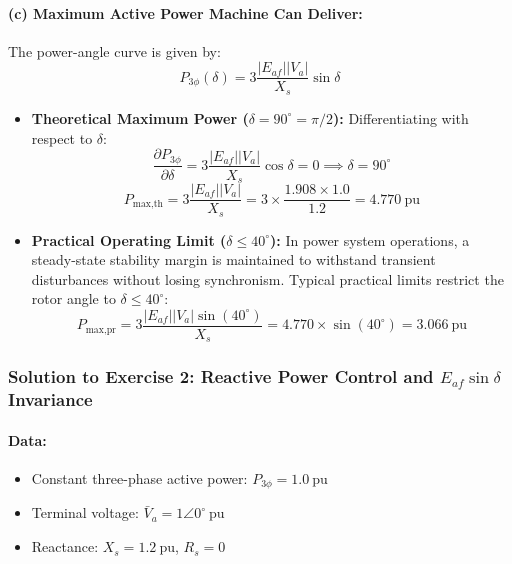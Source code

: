 \paragraph{(c) Maximum Active Power Machine Can Deliver:}
The power-angle curve is given by:
\begin{equation}
    P_{3\phi}(\delta) = 3 \frac{|E_{af}| |V_a|}{X_s} \sin\delta
\end{equation}
\begin{itemize}
    \item \textbf{Theoretical Maximum Power ($\delta = 90^\circ = \pi/2$):}
    Differentiating with respect to $\delta$:
    \[
    \frac{\partial P_{3\phi}}{\partial \delta} = 3 \frac{|E_{af}| |V_a|}{X_s} \cos\delta = 0 \implies \delta = 90^\circ
    \]
    \begin{equation}
        \boxed{P_{\text{max,th}} = 3 \frac{|E_{af}| |V_a|}{X_s} = 3 \times \frac{1.908 \times 1.0}{1.2} = 4.770\ \text{pu}}
    \end{equation}

    \item \textbf{Practical Operating Limit ($\delta \le 40^\circ$):}
    In power system operations, a steady-state stability margin is maintained to withstand transient disturbances without losing synchronism. Typical practical limits restrict the rotor angle to $\delta \le 40^\circ$:
    \begin{equation}
        \boxed{P_{\text{max,pr}} = 3 \frac{|E_{af}| |V_a| \sin(40^\circ)}{X_s} = 4.770 \times \sin(40^\circ) = 3.066\ \text{pu}}
    \end{equation}
\end{itemize}

\subsubsection*{Solution to Exercise 2: Reactive Power Control and $E_{af}\sin\delta$ Invariance}
\paragraph{Data:}
\begin{itemize}
    \item Constant three-phase active power: $P_{3\phi} = 1.0\ \text{pu}$
    \item Terminal voltage: $\bar{V}_a = 1\angle 0^\circ\ \text{pu}$
    \item Reactance: $X_s = 1.2\ \text{pu}$, $R_s = 0$
\end{itemize}

